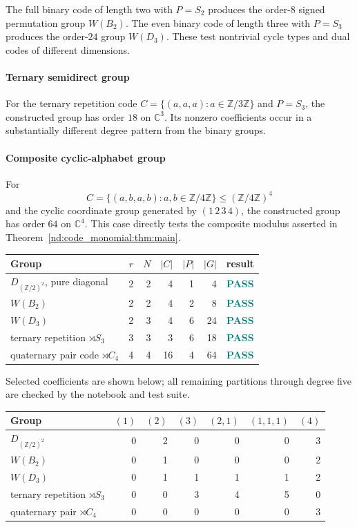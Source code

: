 \documentclass[10pt]{article}
\newcommand{\C}{\mathbb C}
\newcommand{\Z}{\mathbb Z}
\begin{document}
The full binary code of length two with $P=S_2$ produces the order-$8$
signed permutation group $W(B_2)$.  The even binary code of length three with
$P=S_3$ produces the order-$24$ group $W(D_3)$.  These test nontrivial cycle
types and dual codes of different dimensions.

\paragraph{Ternary semidirect group}

For the ternary repetition code
$C=\{(a,a,a):a\in\Z/3\Z\}$ and $P=S_3$, the constructed group has order
$18$ on $\C^3$.  Its nonzero coefficients occur in a substantially different
degree pattern from the binary groups.

\paragraph{Composite cyclic-alphabet group}

For
\[
 C=\{(a,b,a,b):a,b\in\Z/4\Z\}\leq(\Z/4\Z)^4
\]
and the cyclic coordinate group generated by $(1\,2\,3\,4)$, the constructed
group has order $64$ on $\C^4$.  This case directly tests the composite
modulus asserted in Theorem~\ref{nd:code_monomial:thm:main}.

\begin{center}
\begin{tabularx}{\linewidth}{@{}Xrrrrrc@{}}
\toprule
Group & $r$ & $N$ & $|C|$ & $|P|$ & $|G|$ & result\\
\midrule
$D_{(\Z/2)^2}$, pure diagonal &2&2&4&1&4&\textcolor{teal}{\textbf{PASS}}\\
$W(B_2)$ &2&2&4&2&8&\textcolor{teal}{\textbf{PASS}}\\
$W(D_3)$ &2&3&4&6&24&\textcolor{teal}{\textbf{PASS}}\\
ternary repetition $\rtimes S_3$ &3&3&3&6&18&\textcolor{teal}{\textbf{PASS}}\\
quaternary pair code $\rtimes C_4$ &4&4&16&4&64&\textcolor{teal}{\textbf{PASS}}\\
\bottomrule
\end{tabularx}
\end{center}

Selected coefficients are shown below; all remaining partitions through
degree five are checked by the notebook and test suite.
\begin{center}
\begin{tabularx}{\linewidth}{@{}Xrrrrrr@{}}
\toprule
Group & $(1)$ & $(2)$ & $(3)$ & $(2,1)$ & $(1,1,1)$ & $(4)$\\
\midrule
$D_{(\Z/2)^2}$ &0&2&0&0&0&3\\
$W(B_2)$ &0&1&0&0&0&2\\
$W(D_3)$ &0&1&1&1&1&2\\
ternary repetition $\rtimes S_3$ &0&0&3&4&5&0\\
quaternary pair $\rtimes C_4$ &0&0&0&0&0&3\\
\bottomrule
\end{tabularx}
\end{center}
\end{document}
